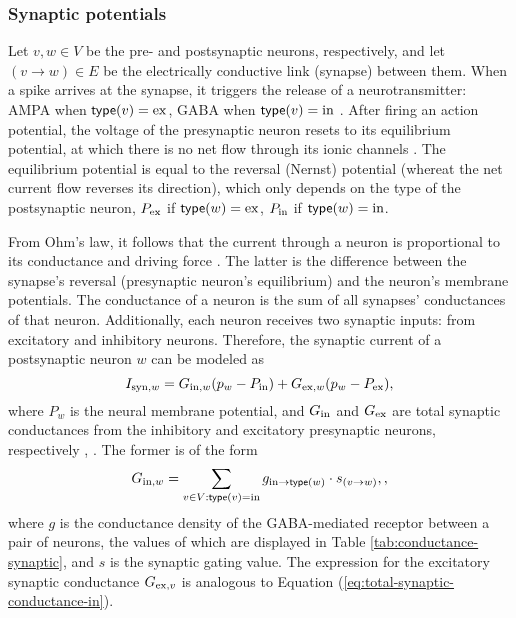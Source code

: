 \subsubsection{Synaptic potentials}
\label{sec:synaptic-potentials}

Let $v, w \in V$ be the pre- and postsynaptic neurons, respectively, and let $(v \to w) \in E$ be the electrically conductive link (synapse) between them. When a spike arrives at the synapse, it triggers the release of a neurotransmitter: AMPA when $\mathsf{type}(v) = \mathrm{ex}$, GABA when $\mathsf{type}(v) = \mathrm{in}$ \cite{Lowet2015}. After firing an action potential, the voltage of the presynaptic neuron resets to its equilibrium potential, at which there is no net flow through its ionic channels \cite{JohnsBook2014:6}. The equilibrium potential is equal to the reversal (Nernst) potential (whereat the net current flow reverses its direction), which only depends on the type of the postsynaptic neuron, $P_{\mathrm{ex}}$ if $\mathsf{type}(w) = \mathrm{ex}$, $P_{\mathrm{in}}$ if $\mathsf{type}(w) = \mathrm{in}$. 

From Ohm's law, it follows that the current through a neuron is proportional to its conductance and driving force \cite{KandelBook2003:6}. The latter is the difference between the synapse's reversal (presynaptic neuron's equilibrium) and the neuron's membrane potentials. The conductance of a neuron is the sum of all synapses' conductances of that neuron. Additionally, each neuron receives two synaptic inputs: from excitatory and inhibitory neurons. Therefore, the synaptic current of a postsynaptic neuron $w$ can be modeled as
\begin{equation}
    I_{\mathrm{syn}, w} = G_{\mathrm{in}, w} (p_{w} - P_{\mathrm{in}}) + G_{\mathrm{ex}, w} (p_{w} - P_{\mathrm{ex}}),
    \label{eq:synaptic-current}
\end{equation}
where $P_w$ is the neural membrane potential, and $G_{\mathrm{in}}$ and $G_{\mathrm{ex}}$ are total synaptic conductances from the inhibitory and excitatory presynaptic neurons, respectively \cite{Lowet2015}, \cite{Jensen2005}. The former is of the form 
\begin{equation}
    G_{\mathrm{in}, w} = \sum_{v \in V: \mathsf{type}(v) = \mathrm{in}} g_{\mathrm{in} \to \mathsf{type}(w)} \cdot s_{(v \to w)},
    \label{eq:total-synaptic-conductance-in},
\end{equation}
where $g$ is the conductance density of the GABA-mediated receptor between a pair of neurons, the values of which are displayed in Table \ref{tab:conductance-synaptic}, and $s$ is the synaptic gating value. The expression for the excitatory synaptic conductance $G_{\mathrm{ex}, v}$ is analogous to Equation (\ref{eq:total-synaptic-conductance-in}).

